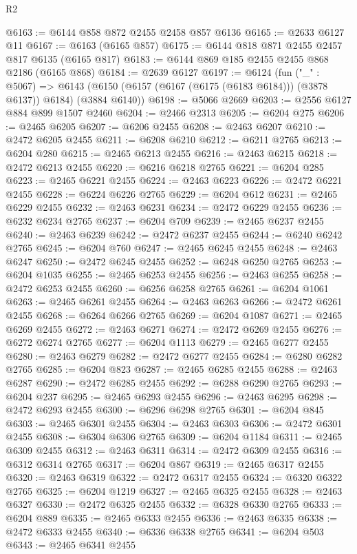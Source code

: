 \begin{lexlean}{R2}
\begin{coremodule}
@6163 := @6144 @858 @872 @2455 @2458 @857 @6136
@6165 := @2633 @6127 @11
@6167 := @6163 (@6165 @857)
@6175 := @6144 @818 @871 @2455 @2457 @817 @6135 (@6165 @817)
@6183 := @6144 @869 @185 @2455 @2455 @868 @2186 (@6165 @868)
@6184 := @2639 @6127
@6197 := @6124
    (fun ("_" : @5067) =>
    @6143 (@6150 (@6157 (@6167 (@6175 (@6183 @6184))) (@3878 @6137)) @6184) (@3884 @6140))
@6198 := @5066 @2669
@6203 := @2556 @6127 @884 @899 @1507 @2460
@6204 := @2466 @2313
@6205 := @6204 @275
@6206 := @2465 @6205
@6207 := @6206 @2455
@6208 := @2463 @6207
@6210 := @2472 @6205 @2455
@6211 := @6208 @6210
@6212 := @6211 @2765
@6213 := @6204 @280
@6215 := @2465 @6213 @2455
@6216 := @2463 @6215
@6218 := @2472 @6213 @2455
@6220 := @6216 @6218 @2765
@6221 := @6204 @285
@6223 := @2465 @6221 @2455
@6224 := @2463 @6223
@6226 := @2472 @6221 @2455
@6228 := @6224 @6226 @2765
@6229 := @6204 @612
@6231 := @2465 @6229 @2455
@6232 := @2463 @6231
@6234 := @2472 @6229 @2455
@6236 := @6232 @6234 @2765
@6237 := @6204 @709
@6239 := @2465 @6237 @2455
@6240 := @2463 @6239
@6242 := @2472 @6237 @2455
@6244 := @6240 @6242 @2765
@6245 := @6204 @760
@6247 := @2465 @6245 @2455
@6248 := @2463 @6247
@6250 := @2472 @6245 @2455
@6252 := @6248 @6250 @2765
@6253 := @6204 @1035
@6255 := @2465 @6253 @2455
@6256 := @2463 @6255
@6258 := @2472 @6253 @2455
@6260 := @6256 @6258 @2765
@6261 := @6204 @1061
@6263 := @2465 @6261 @2455
@6264 := @2463 @6263
@6266 := @2472 @6261 @2455
@6268 := @6264 @6266 @2765
@6269 := @6204 @1087
@6271 := @2465 @6269 @2455
@6272 := @2463 @6271
@6274 := @2472 @6269 @2455
@6276 := @6272 @6274 @2765
@6277 := @6204 @1113
@6279 := @2465 @6277 @2455
@6280 := @2463 @6279
@6282 := @2472 @6277 @2455
@6284 := @6280 @6282 @2765
@6285 := @6204 @823
@6287 := @2465 @6285 @2455
@6288 := @2463 @6287
@6290 := @2472 @6285 @2455
@6292 := @6288 @6290 @2765
@6293 := @6204 @237
@6295 := @2465 @6293 @2455
@6296 := @2463 @6295
@6298 := @2472 @6293 @2455
@6300 := @6296 @6298 @2765
@6301 := @6204 @845
@6303 := @2465 @6301 @2455
@6304 := @2463 @6303
@6306 := @2472 @6301 @2455
@6308 := @6304 @6306 @2765
@6309 := @6204 @1184
@6311 := @2465 @6309 @2455
@6312 := @2463 @6311
@6314 := @2472 @6309 @2455
@6316 := @6312 @6314 @2765
@6317 := @6204 @867
@6319 := @2465 @6317 @2455
@6320 := @2463 @6319
@6322 := @2472 @6317 @2455
@6324 := @6320 @6322 @2765
@6325 := @6204 @1219
@6327 := @2465 @6325 @2455
@6328 := @2463 @6327
@6330 := @2472 @6325 @2455
@6332 := @6328 @6330 @2765
@6333 := @6204 @889
@6335 := @2465 @6333 @2455
@6336 := @2463 @6335
@6338 := @2472 @6333 @2455
@6340 := @6336 @6338 @2765
@6341 := @6204 @503
@6343 := @2465 @6341 @2455

\end{coremodule}
\end{lexlean}

